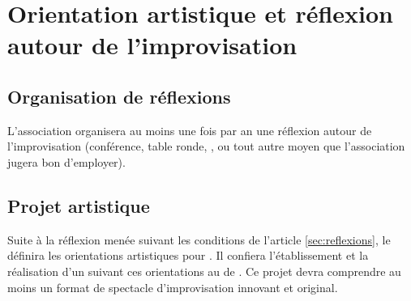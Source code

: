 \documentclass[a4paper,french,10pt]{article}
\newcommand{\article}[1]{\subsection{#1}\addtocounter{article}{1}}
\newcounter{article}
\newcommand{\artref}[1]{article \ref{#1}}
\begin{document}

\section{Orientation artistique et réflexion autour de l'improvisation}
\article{Organisation de réflexions}
\label{sec:reflexions}
L'association organisera au moins une fois par an une réflexion autour
de l'improvisation (conférence, table ronde, \AG{}, ou
tout autre moyen que l'association jugera bon d'employer).


\article{Projet artistique}
\label{sec:projet}
Suite à la réflexion menée suivant les conditions de l'\artref{sec:reflexions}, le \bureau{} définira les orientations artistiques pour \troupe{}. Il confiera l'établissement et la réalisation d'un \PA{} suivant ces orientations au \DA{} de \troupe{}. Ce projet devra comprendre au moins un format de spectacle d'improvisation innovant et original.



\end{document}
